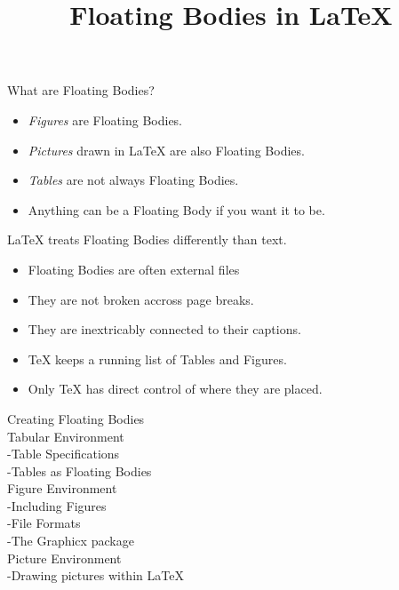 \documentclass[landscape]{slides}
\begin{document}
\begin{normalsize}
\begin{slide}
\title{Floating Bodies in \LaTeX{}}
\maketitle
\end{slide}


\begin{slide}
{\Huge What are Floating Bodies?}
\begin{itemize}
\item \emph{Figures} are Floating Bodies.
\item \emph{Pictures} drawn in \LaTeX{} are also Floating Bodies.
\item \emph{Tables} are not always Floating Bodies.
\item Anything can be a Floating Body if you want it to be. 
\end{itemize}
\end{slide}


\begin{slide}
\LaTeX{} treats Floating Bodies differently than text.
\begin{itemize}
\item Floating Bodies are often external files
\item They are not broken accross page breaks.
\item They are inextricably connected to their captions.
\item \TeX{} keeps a running list of Tables and Figures. 
\item Only \TeX{} has direct control of where they are placed.
\end{itemize}
\end{slide}


\begin{slide}
{\huge Creating Floating Bodies}
\vspace{1cm}\\
Tabular Environment\\
 -Table Specifications\\
 -Tables as Floating Bodies
\vspace{1cm}\\
Figure Environment\\
 -Including Figures\\
 -File Formats\\
 -The Graphicx package
\vspace{1cm}\\
Picture Environment\\
 -Drawing pictures within \LaTeX{}\\
\end{slide}


\end{normalsize}
\end{document}
